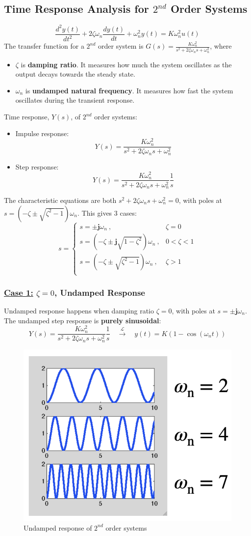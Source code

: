 \documentclass[12pt,a4paper]{article}
\begin{document}
\subsection{Time Response Analysis for $2^{nd}$ Order Systems}%
\[\frac{d^{2}y(t)}{dt^{2}}+2\zeta\omega_{n}\frac{dy(t)}{dt}+\omega_{n}^{2}y(t) = K\omega_{n}^{2}u(t)\]
The transfer function for a $2^{nd}$ order system is $G(s)= \frac{K\omega_{n}^{2}}{s^{2}+2\zeta\omega_{n}s+\omega_{n}^{2}}$, where
\begin{itemize}
\item $\zeta$ is \textbf{damping ratio}. It measures how much the system oscillates as the output decays towards the steady state.
\item $\omega_{n}$ is \textbf{undamped natural frequency}. It measures how fast the system oscillates during the transient response.
\end{itemize}
Time response, $Y(s)$, of  $2^{nd}$ order systems:
\begin{itemize}
\item Impulse response:\[Y(s)= \frac{K\omega_{n}^{2}}{s^{2}+2\zeta\omega_{n}s+\omega_{n}^{2}}\]
\item Step response:\[Y(s)= \frac{K\omega_{n}^{2}}{s^{2}+2\zeta\omega_{n}s+\omega_{n}^{2}}\frac{1}{s}\]
\end{itemize}
The characteristic equations are both $s^{2}+2\zeta\omega_{n}s+\omega_{n}^{2}=0$, with poles at $s = (-\zeta\pm \sqrt{\zeta^{2}-1})\omega_{n}$.
This gives 3 cases: \[s=\begin{cases}
s = \pm\mathbf{j}\omega_{n}\ ,&\zeta = 0\\
s = (-\zeta\pm \mathbf{j}\sqrt{1-\zeta^{2}})\omega_{n}\ , & 0<\zeta<1\\
s = (-\zeta\pm \sqrt{\zeta^{2}-1})\omega_{n}\ , &\zeta>1\\
\end{cases} \]

\subsubsection{\underline{Case 1:} $\zeta = 0$, Undamped Response}
Undamped response happens when damping ratio $\zeta=0$, with poles at $s = \pm \mathbf{j}\omega_{n}$.
The undamped step response is \textbf{purely sinusoidal}:
\[Y(s) = \frac{K\omega_{n}^{2}}{s^{2}	+2\zeta\omega_{n}s+\omega_{n}^{2}}\frac{1}{s}\quad \xrightarrow{\mathcal{L}}\quad y(t) = K(1-\cos(\omega_{n}t)) \]
\begin{figure}[H] \centering 
\includegraphics[width=.4\textwidth]{images/case1.png}
\caption{Undamped response of $2^{nd}$ order systems}
\end{figure}
\end{document}
